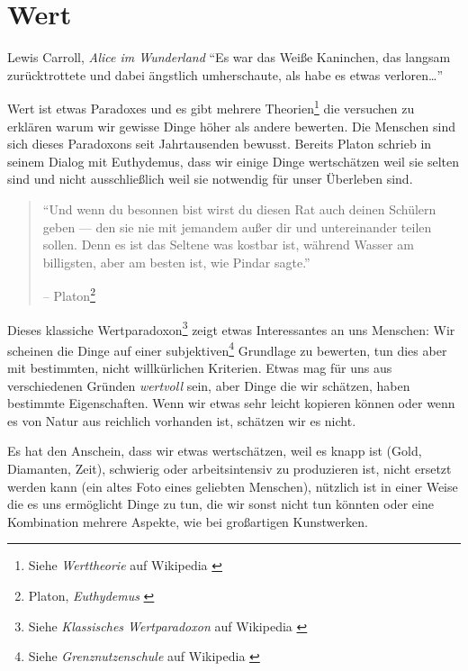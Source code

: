 \chapter{Wert}
\label{les:10}

\begin{chapquote}{Lewis Carroll, \textit{Alice im Wunderland}}
\enquote{Es war das Weiße Kaninchen, das langsam zurücktrottete und dabei
ängstlich umherschaute, als habe es etwas verloren\ldots}
\end{chapquote}

Wert ist etwas Paradoxes und es gibt mehrere Theorien\footnote{Siehe
\textit{Werttheorie} auf Wikipedia \cite{wiki:theory-of-value}} die versuchen zu
erklären warum wir gewisse Dinge höher als andere bewerten. Die Menschen sind
sich dieses Paradoxons seit Jahrtausenden bewusst. Bereits Platon schrieb in
seinem Dialog mit Euthydemus, dass wir einige Dinge wertschätzen weil sie selten
sind und nicht ausschließlich weil sie notwendig für unser Überleben sind.

\begin{quotation}\begin{samepage}
\enquote{Und wenn du besonnen bist wirst du diesen Rat auch deinen Schülern
geben --- den sie nie mit jemandem außer dir und untereinander teilen sollen.
Denn es ist das Seltene was kostbar ist, während Wasser am billigsten, aber am
besten ist, wie Pindar sagte.}
\begin{flushright} -- Platon\footnote{Platon, \textit{Euthydemus} \cite{euthydemus}}
\end{flushright}\end{samepage}\end{quotation}

Dieses klassiche Wertparadoxon\footnote{Siehe \textit{Klassisches Wertparadoxon}
auf Wikipedia \cite{wiki:paradox-of-value}} zeigt etwas Interessantes an uns
Menschen: Wir scheinen die Dinge auf einer subjektiven\footnote{Siehe
\textit{Grenznutzenschule} auf Wikipedia \cite{wiki:subjective-theory-of-value}}
Grundlage zu bewerten, tun dies aber mit bestimmten, nicht willkürlichen
Kriterien. Etwas mag für uns aus verschiedenen Gründen \textit{wertvoll} sein,
aber Dinge die wir schätzen, haben bestimmte Eigenschaften. Wenn wir etwas sehr
leicht kopieren können oder wenn es von Natur aus reichlich vorhanden ist,
schätzen wir es nicht.

Es hat den Anschein, dass wir etwas wertschätzen, weil es knapp ist (Gold,
Diamanten, Zeit), schwierig oder arbeitsintensiv zu produzieren ist, nicht
ersetzt werden kann (ein altes Foto eines geliebten Menschen), nützlich ist in
einer Weise die es uns ermöglicht Dinge zu tun, die wir sonst nicht tun könnten
oder eine Kombination mehrere Aspekte, wie bei großartigen Kunstwerken.

